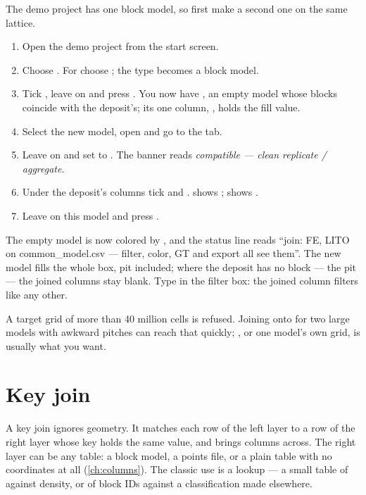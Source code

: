 \begin{tryit}
The demo project has one block model, so first make a second one on the same lattice.
\begin{enumerate}
\item Open the demo project from the start screen.
\item Choose . For  choose ; the type becomes a block model.
\item Tick , leave  on  and press . You now have , an empty model whose blocks coincide with the deposit's; its one column, , holds the fill value.
\item Select the new model, open  and go to the  tab.
\item Leave  on  and set  to . The banner reads \emph{compatible — clean replicate / aggregate}.
\item Under the deposit's columns tick  and .  shows ;  shows .
\item Leave  on this model and press .
\end{enumerate}
The empty model is now colored by , and the status line reads “join: FE, LITO on common\_model.csv — filter, color, GT and export all see them”. The new model fills the whole box, pit included; where the deposit has no block — the pit — the joined columns stay blank. Type  in the filter box: the joined column filters like any other.
\end{tryit}

\begin{caution}
A target grid of more than 40 million cells is refused. Joining onto  for two large models with awkward pitches can reach that quickly; , or one model's own grid, is usually what you want.
\end{caution}

\section{Key join}\label{sec:joins-key}

A key join ignores geometry. It matches each row of the left layer to a row of the right layer whose key holds the same value, and brings columns across. The right layer can be any table: a block model, a points file, or a plain table with no coordinates at all (\cref{ch:columns}). The classic use is a lookup — a small table of  against density, or of block IDs against a classification made elsewhere.

